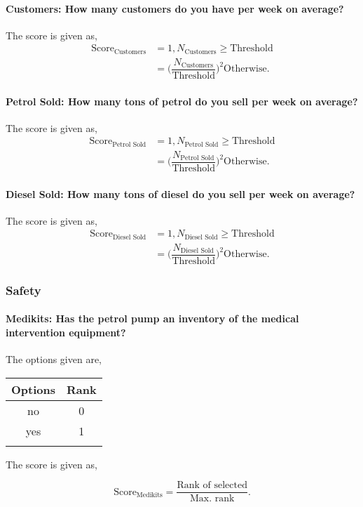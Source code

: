 \documentclass[oneside,twocolumn]{article}
\newcommand{\tsub}[2]{\text{#1}_{\text{#2}}}
\newcommand{\tsubb}[2]{#1_{\text{#2}}}
\newcommand{\dsub}[2]{\dfrac{\text{#1}}{\text{#2}}}
\newcommand{\singsel}[1]
{
	\[
		\tsub{Score}{#1} = \dsub{Rank of selected}{Max. rank}.
	\]
}
\newenvironment{ttable}
{
\begin{center}
\begin{tabular}{c|c}
\hline
}
{
\\ \hline
\end{tabular}
\end{center}
}
\begin{document}
\paragraph{Customers: How many customers do you have per week on average?}

The score is given as,
\begin{align*}
\tsub{Score}{Customers} &= 1, \tsubb{N}{Customers} \ge \text{Threshold} \\
        &=
\Big(\dfrac{\tsubb{N}{Customers}}{\text{Threshold}}\Big)^{2}
\text{Otherwise}.
\end{align*}
\paragraph{Petrol Sold: How many tons of petrol do you sell per week on average?}

The score is given as,
\begin{align*}
\tsub{Score}{Petrol Sold} &= 1, \tsubb{N}{Petrol Sold} \ge \text{Threshold} \\
        &=
\Big(\dfrac{\tsubb{N}{Petrol Sold}}{\text{Threshold}}\Big)^{2}
\text{Otherwise}.
\end{align*}
\paragraph{Diesel Sold: How many tons of diesel do you sell per week on average?}

The score is given as,
\begin{align*}
\tsub{Score}{Diesel Sold} &= 1, \tsubb{N}{Diesel Sold} \ge \text{Threshold} \\
        &=
\Big(\dfrac{\tsubb{N}{Diesel Sold}}{\text{Threshold}}\Big)^{2}
\text{Otherwise}.
\end{align*}
\subsubsection{Safety}

\paragraph{Medikits: Has the petrol pump an inventory of the medical intervention equipment?}

The options given are,
\begin{ttable}
Options & Rank \\ \hline
no & 0 \\
yes & 1 \\
\hline
\end{ttable}
The score is given as,
\singsel{Medikits}
\end{document}
